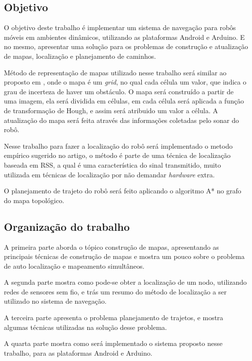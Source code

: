 \documentclass[12pt]{article}
\begin{document}
 
 \subsection{Objetivo}
    
    O objetivo deste trabalho é implementar um sistema de navegação para robôs móveis em ambientes dinâmicos, utilizando as plataformas Android e Arduino. 
    E no mesmo, apresentar uma solução para os problemas de construção e atualização de mapas, localização e planejamento de caminhos.
    
    Método de representação de mapas utilizado nesse trabalho será similar ao proposto em \cite{cnn}, onde o mapa é um \textit{grid},
    no qual cada célula um valor, que indica o grau de incerteza de haver um obstáculo. O mapa será construído a partir de uma imagem, ela
    será dividida em células, em cada célula será aplicada a função de transformação de Hough\cite{openCV}, e assim será atribuido um valor a célula. A atualização do 
    mapa será feita através das informações coletadas pelo sonar do robô.
    
    Nesse trabalho para fazer a localização do robô será implementado o metodo empírico sugerido no artigo\cite{wifiRadar}, 
	o método é parte de uma técnica de localização baseada em RSS, a qual é uma característica 
	do sinal transmitido, muito utilizada em técnicas de localização por não demandar \textit{hardware} extra.
	
    O planejamento de trajeto do robô será feito aplicando o algoritmo A*\cite{aestrela} no grafo do mapa topológico.
    
 \subsection{Organização do trabalho}
  A primeira parte aborda o tópico construção de mapas, apresentando as principais técnicas de construção de mapas e mostra um pouco sobre o problema de auto localização e mapeamento simultâneos.
  
  A segunda parte mostra como pode-se obter a localização de um nodo, utilizando redes de sensores sem fio, e trás um resumo do método de localização a ser utilizado no sistema 
  de navegação.
  
  A terceira parte apresenta o problema planejamento de trajetos, e mostra algumas técnicas utilizadas na solução desse problema.
  
  A quarta parte mostra como será implementado o sistema proposto nesse trabalho, para as plataformas Android e Arduino.
  
\end{document}
